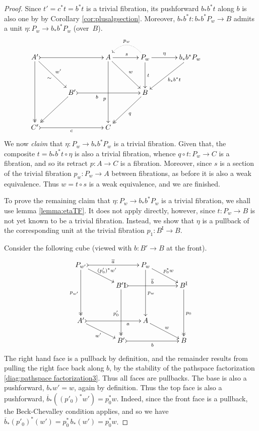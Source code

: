 \documentclass[12pt]{article}
\newcommand{\ra}{\ensuremath{\rightarrow}}
\newcommand{\I}{\ensuremath{\mathrm{I}}}
\theoremstyle{remark}
\theoremstyle{definition}
\begin{document}
\begin{proof}
Since $t' = c^*t = b^*t$ is a trivial fibration, its pushforward $b_*b^*t$ along $b$ is also one by by Corollary \ref{cor:plusalgsection}.  Moreover, $b_*b^*t : b_*b^*P_w \ra B$ admits a unit $\eta : P_w \ra  b_*b^*P_w$ (over~$B$).  
\begin{equation}\label{diag:EEPfactored3}
\xymatrix@=1.5em{
A' \ar@{->>}[dddd] \ar[rrdd]_{\sim}^{w'} \ar@{>->}[rrrr] && && A \ar[dddd]_>>>>>>>>>>>>p \ar[rrdd]^{w} \ar[rr]^s && \ar@{.>}@/_1.5pc/[ll]_{p_w} P_w \ar[dd]^t \ar[rr]^-\eta && b_*b^*P_w \ar[lldd]^{b_*b^*t}\\
\\
&& B' \ar@{->>}[lldd] \ar@{>->}[rrrr]_<<<<<<<<<<b  &&&& B \ar@{->>}[lldd]^q &&&& \\
\\
C' \ar@{>->}[rrrr]_c &&&& C &&&&
}
\end{equation}
We now \emph{claim} that $\eta : P_w \ra  b_*b^*P_w$ is a trivial fibration.  Given that,  the composite $t = b_*b^*t \circ \eta$ is also a trivial fibration, whence $q\circ t : P_w \ra C$ is a fibration, and so its retract $p:A\ra C$ is a fibration.  Moreover, since $s$ is a section of the trivial fibration $p_w: P_w\ra A$ between fibrations, as before it is also a weak equivalence. Thus $w=t\circ s$ is a weak equivalence, and we are finished. 

To prove the remaining claim that $\eta : P_w \ra  b_*b^*P_w$ is a trivial fibration, we shall use lemma \ref{lemma:etaTF}.  It does not apply directly, however, since $t : P_w \ra B$ is not yet known to be a trivial fibration.  Instead, we show that $\eta$ is a pullback of the corresponding unit at the trivial fibration $p_1 : B^\I \ra B$.

Consider the following cube (viewed with $b:B'\ra B$ at the front).
\begin{equation}\label{diag:ppcube}
\xymatrix@=1.5em{
P_{w'} \ar@{->>}[ddd]_{p_{w'}} \ar[rrd]^{(p'_0)^*w'} \ar@{>->}[rrr]^{\overline{a}}
		&&& P_w \ar[ddd]^{p_w} \ar[rrd]^{p_0^*w} &&\\
&& B'^\I \ar@{->>}[ddd]_{p'_0} \ar@{>->}[rrr]^{\overline{b}}  
		&&& B^\I \ar@{->>}[ddd]^{p_0} \\
\\
A' \ar@{>->}[rrr]_>>>>>>>a  \ar[rrd]_{w'}
		&&& A \ar[rrd]^{w} &&\\
&& B'\ar@{>->}[rrr]_b &&& B
}
\end{equation}
The right hand face is a pullback by definition, and the remainder results from pulling the right face back along $b$, by the stability of the pathspace factorization \eqref{diag:pathspace factorization3}. Thus all faces are pullbacks.  The base is also a pushforward, $b_*w'=w$, again by definition.  Thus the top face is also a pushforward, $\overline{b}_*((p'_0)^*w')=p_0^*w$. Indeed, since the front face is a pullback, the Beck-Chevalley condition applies, and so we have $\overline{b}_*(p'_0)^*(w') = p_0^*\,b_*(w') = p_0^*w$.


\end{proof}
\end{document}
